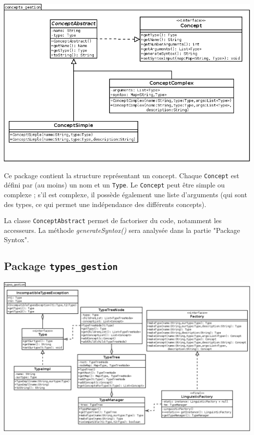 \documentclass[12pt]{report}
\begin{document}
\begin{center}
\includegraphics[scale=0.5]{DiagLinguistic_concepts_gestion.png}
\end{center}

Ce package contient la structure représentant un concept. Chaque \texttt{Concept} est défini par (au moins) un nom et un \texttt{Type}. Le \texttt{Concept} peut être simple ou complexe ; s'il est complexe, il possède également une liste d'arguments (qui sont des types, ce qui permet une indépendance des différents concepts).

La classe \texttt{ConceptAbstract} permet de factoriser du code, notamment les accesseurs.
La méthode \emph{generateSyntox()} sera analysée dans la partie "Package Syntox".

\subsection{Package \texttt{types\_gestion}}

\begin{center}
\includegraphics[scale=0.43]{DiagLinguistic_types_gestion.png}
\end{center}
\end{document}
